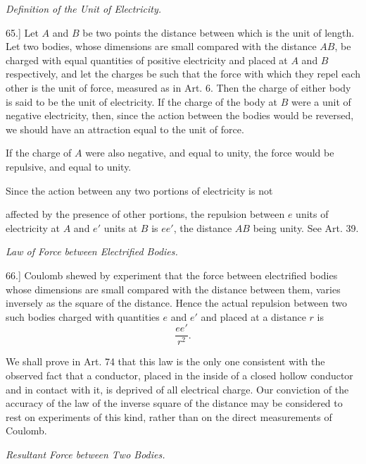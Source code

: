 \documentclass[11pt,a4paper]{article}
\begin{document}
\begin{center}
\textit{Definition of the Unit of Electricity.}
\end{center}

65.] Let \(A\) and \(B\) be two points the distance between which is the
unit of length. Let two bodies, whose dimensions are small compared
with the distance \(AB\), be charged with equal quantities of positive
electricity and placed at \(A\) and \(B\) respectively, and let the charges
be such that the force with which they repel each other is the unit of
force, measured as in Art. 6. Then the charge of either body is said
to be the unit of electricity. If the charge of the body at \(B\) were
a unit of negative electricity, then, since the action between the
bodies would be reversed, we should have an attraction equal to the
unit of force.

If the charge of \(A\) were also negative, and equal to unity, the
force would be repulsive, and equal to unity.

Since the action between any two portions of electricity is not

\clearpage
\setcounter{footnote}{0}

affected by the presence of other portions, the repulsion between \(e\)
units of electricity at \(A\) and \(e'\) units at \(B\) is \(ee'\), the
distance \(AB\) being unity. See Art. 39.

\begin{center}
\textit{Law of Force between Electrified Bodies.}
\end{center}

66.] Coulomb shewed by experiment that the force between electrified
bodies whose dimensions are small compared with the distance between
them, varies inversely as the square of the distance. Hence the actual
repulsion between two such bodies charged with quantities \(e\) and
\(e'\) and placed at a distance \(r\) is
\[
\frac{ee'}{r^2}.
\]

We shall prove in Art. 74 that this law is the only one consistent with
the observed fact that a conductor, placed in the inside of a closed
hollow conductor and in contact with it, is deprived of all electrical
charge. Our conviction of the accuracy of the law of the inverse square
of the distance may be considered to rest on experiments of this kind,
rather than on the direct measurements of Coulomb.

\begin{center}
\textit{Resultant Force between Two Bodies.}
\end{center}
\end{document}
